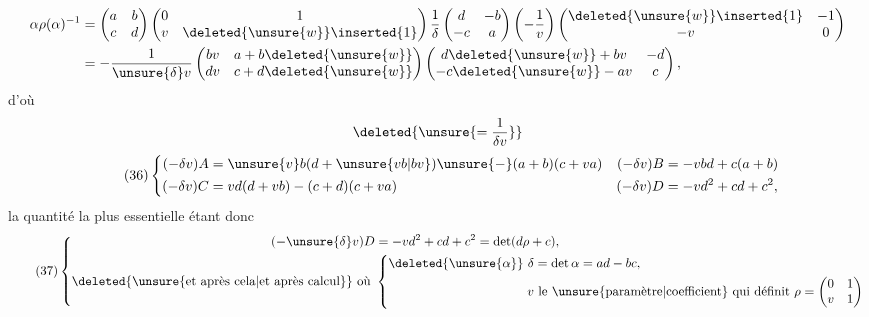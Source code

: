 \[
\begin{aligned}
\alpha\rho(\alpha)^{-1}
&=\begin{pmatrix}a&b\\c&d\end{pmatrix}
\begin{pmatrix}0&1\\v&\deleted{\unsure{w}}\inserted{1}\end{pmatrix}
\frac1\delta\begin{pmatrix}d&-b\\-c&a\end{pmatrix}
\left(-\frac1v\right)
\begin{pmatrix}\deleted{\unsure{w}}\inserted{1}&-1\\-v&0\end{pmatrix}\\
&=-\frac1{\unsure{\delta}v}
\begin{pmatrix}bv&a+b\deleted{\unsure{w}}\\dv&c+d\deleted{\unsure{w}}\end{pmatrix}
\begin{pmatrix}d\deleted{\unsure{w}}+bv&-d\\-c\deleted{\unsure{w}}-av&c\end{pmatrix},
\end{aligned}
\]
d'où
\[
\deleted{\unsure{=\frac1{\delta v}}}
\]
\[
\tag{36}
\left\{\begin{aligned}
(-\delta v)A&=\unsure{v}b(d+\unsure{vb|bv})\unsure{-}(a+b)(c+va)
&(-\delta v)B&=-vbd+c(a+b)\\
(-\delta v)C&=vd(d+vb)-(c+d)(c+va)
&(-\delta v)D&=-vd^2+cd+c^2,
\end{aligned}\right.
\]
la quantité la plus essentielle étant donc
\[
\tag{37}
\left\{\begin{aligned}
(-\unsure{\delta}v)D&=-vd^2+cd+c^2=\det(d\rho+c),\\
\text{\deleted{\unsure{et après cela|et après calcul}} où }&
\left\{\begin{aligned}
\deleted{\unsure{\alpha}}\ \delta&=\det\alpha=ad-bc,\\
v&\ \text{le \unsure{paramètre|coefficient} qui définit }
\rho=\begin{pmatrix}0&1\\v&1\end{pmatrix}
\end{aligned}\right.
\end{aligned}\right.
\]

